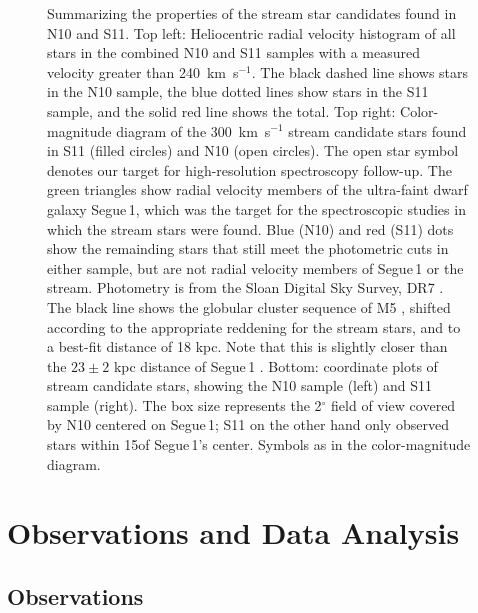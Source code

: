\documentclass[manuscript]{aastex}
\begin{document}
\begin{figure}
\begin{center}
\begin{tabular}{cc}
  \end{tabular}
  \caption{ {\scriptsize Summarizing the properties of the stream star candidates found in N10 and S11. Top left: Heliocentric radial velocity histogram of all stars in the combined N10 and S11 samples with a measured velocity greater than 240~km~s$^{-1}$. The black dashed line shows stars in the N10 sample, the blue dotted lines show stars in the S11 sample, and the solid red line shows the total. Top right: Color-magnitude diagram of the 300~km~s$^{-1}$ stream candidate stars found in S11 (filled circles) and N10 (open circles). The open star symbol denotes our target for high-resolution spectroscopy follow-up. The green triangles show radial velocity members of the ultra-faint dwarf galaxy Segue\,1, which was the target for the spectroscopic studies in which the stream stars were found. Blue (N10) and red (S11) dots show the remainding stars that still meet the photometric cuts in either sample, but are not radial velocity members of Segue\,1 or the stream. Photometry is from the Sloan Digital Sky Survey, DR7 \citep{Abazajian2009}. The black line shows the globular cluster sequence of M5 \citep{An2008}, shifted according to the appropriate reddening for the stream stars, and to a best-fit distance of 18 kpc. Note that this is slightly closer than the $23 \pm 2$ kpc distance of Segue\,1 \citep{Belokurov2007}.    Bottom: coordinate plots of stream candidate stars, showing the N10 sample (left) and S11 sample (right). The box size represents the 2$^{\circ}$ field of view covered by N10 centered on Segue\,1; S11 on the other hand only  observed stars within 15\arcmin of Segue\,1's center. Symbols as in the color-magnitude diagram.} }
  \label{fig:col_mag}
 \end{center}
\end{figure}






\section{Observations and Data Analysis}
\label{sec:obs}




\subsection{Observations}
\end{document}
